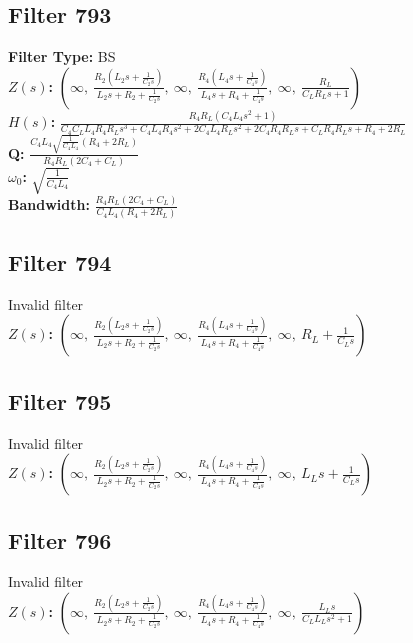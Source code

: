 \documentclass{article}
\begin{document}
\subsection*{Filter 793}
\textbf{Filter Type:} BS \\ 
\textbf{$Z(s)$:} $\left( \infty, \  \frac{R_{2} \left(L_{2} s + \frac{1}{C_{2} s}\right)}{L_{2} s + R_{2} + \frac{1}{C_{2} s}}, \  \infty, \  \frac{R_{4} \left(L_{4} s + \frac{1}{C_{4} s}\right)}{L_{4} s + R_{4} + \frac{1}{C_{4} s}}, \  \infty, \  \frac{R_{L}}{C_{L} R_{L} s + 1}\right)$ \\ 
\textbf{$H(s)$:} $\frac{R_{4} R_{L} \left(C_{4} L_{4} s^{2} + 1\right)}{C_{4} C_{L} L_{4} R_{4} R_{L} s^{3} + C_{4} L_{4} R_{4} s^{2} + 2 C_{4} L_{4} R_{L} s^{2} + 2 C_{4} R_{4} R_{L} s + C_{L} R_{4} R_{L} s + R_{4} + 2 R_{L}}$ \\ 
\textbf{Q:} $\frac{C_{4} L_{4} \sqrt{\frac{1}{C_{4} L_{4}}} \left(R_{4} + 2 R_{L}\right)}{R_{4} R_{L} \left(2 C_{4} + C_{L}\right)}$ \\ 
\textbf{$\omega_0$:} $\sqrt{\frac{1}{C_{4} L_{4}}}$ \\ 
\textbf{Bandwidth:} $\frac{R_{4} R_{L} \left(2 C_{4} + C_{L}\right)}{C_{4} L_{4} \left(R_{4} + 2 R_{L}\right)}$ \\ 
\subsection*{Filter 794}
Invalid filter \\ 
\textbf{$Z(s)$:} $\left( \infty, \  \frac{R_{2} \left(L_{2} s + \frac{1}{C_{2} s}\right)}{L_{2} s + R_{2} + \frac{1}{C_{2} s}}, \  \infty, \  \frac{R_{4} \left(L_{4} s + \frac{1}{C_{4} s}\right)}{L_{4} s + R_{4} + \frac{1}{C_{4} s}}, \  \infty, \  R_{L} + \frac{1}{C_{L} s}\right)$ \\ 
\subsection*{Filter 795}
Invalid filter \\ 
\textbf{$Z(s)$:} $\left( \infty, \  \frac{R_{2} \left(L_{2} s + \frac{1}{C_{2} s}\right)}{L_{2} s + R_{2} + \frac{1}{C_{2} s}}, \  \infty, \  \frac{R_{4} \left(L_{4} s + \frac{1}{C_{4} s}\right)}{L_{4} s + R_{4} + \frac{1}{C_{4} s}}, \  \infty, \  L_{L} s + \frac{1}{C_{L} s}\right)$ \\ 
\subsection*{Filter 796}
Invalid filter \\ 
\textbf{$Z(s)$:} $\left( \infty, \  \frac{R_{2} \left(L_{2} s + \frac{1}{C_{2} s}\right)}{L_{2} s + R_{2} + \frac{1}{C_{2} s}}, \  \infty, \  \frac{R_{4} \left(L_{4} s + \frac{1}{C_{4} s}\right)}{L_{4} s + R_{4} + \frac{1}{C_{4} s}}, \  \infty, \  \frac{L_{L} s}{C_{L} L_{L} s^{2} + 1}\right)$ \\ 
\end{document}

